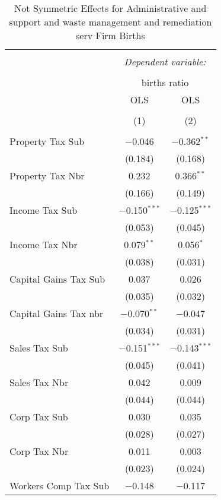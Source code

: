 
\begin{table}[!htbp] \centering 
  \caption{Not Symmetric Effects for  Administrative and support and waste management and remediation serv Firm Births} 
  \label{56noequality} 
\footnotesize 
\begin{tabular}{@{\extracolsep{5pt}}lcc} 
\\[-1.8ex]\hline 
\hline \\[-1.8ex] 
 & \multicolumn{2}{c}{\textit{Dependent variable:}} \\ 
\cline{2-3} 
\\[-1.8ex] & \multicolumn{2}{c}{births ratio} \\ 
 & OLS & OLS \\ 
\\[-1.8ex] & (1) & (2)\\ 
\hline \\[-1.8ex] 
 Property Tax Sub & $-$0.046 & $-$0.362$^{**}$ \\ 
  & (0.184) & (0.168) \\ 
  Property Tax Nbr & 0.232 & 0.366$^{**}$ \\ 
  & (0.166) & (0.149) \\ 
  Income Tax Sub & $-$0.150$^{***}$ & $-$0.125$^{***}$ \\ 
  & (0.053) & (0.045) \\ 
  Income Tax Nbr & 0.079$^{**}$ & 0.056$^{*}$ \\ 
  & (0.038) & (0.031) \\ 
  Capital Gains Tax Sub & 0.037 & 0.026 \\ 
  & (0.035) & (0.032) \\ 
  Capital Gains Tax nbr & $-$0.070$^{**}$ & $-$0.047 \\ 
  & (0.034) & (0.031) \\ 
  Sales Tax Sub & $-$0.151$^{***}$ & $-$0.143$^{***}$ \\ 
  & (0.045) & (0.041) \\ 
  Sales Tax Nbr & 0.042 & 0.009 \\ 
  & (0.044) & (0.044) \\ 
  Corp Tax Sub & 0.030 & 0.035 \\ 
  & (0.028) & (0.027) \\ 
  Corp Tax Nbr & 0.011 & 0.003 \\ 
  & (0.023) & (0.024) \\ 
  Workers Comp Tax Sub & $-$0.148 & $-$0.117 \\ 

\end{tabular}
\end{table}
